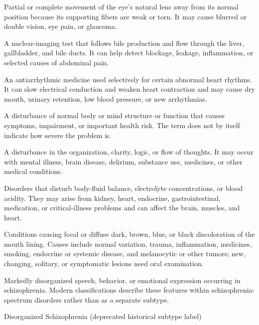  Partial or complete movement of the eye’s natural lens away from its normal position because its supporting fibers are weak or torn. It may cause blurred or double vision, eye pain, or glaucoma.

 A nuclear-imaging test that follows bile production and flow through the liver, gallbladder, and bile ducts. It can help detect blockage, leakage, inflammation, or selected causes of abdominal pain.

 An antiarrhythmic medicine used selectively for certain abnormal heart rhythms. It can slow electrical conduction and weaken heart contraction and may cause dry mouth, urinary retention, low blood pressure, or new arrhythmias.

 A disturbance of normal body or mind structure or function that causes symptoms, impairment, or important health risk. The term does not by itself indicate how severe the problem is.

 A disturbance in the organization, clarity, logic, or flow of thoughts. It may occur with mental illness, brain disease, delirium, substance use, medicines, or other medical conditions.

 Disorders that disturb body-fluid balance, electrolyte concentrations, or blood acidity. They may arise from kidney, heart, endocrine, gastrointestinal, medication, or critical-illness problems and can affect the brain, muscles, and heart.

 Conditions causing focal or diffuse dark, brown, blue, or black discoloration of the mouth lining. Causes include normal variation, trauma, inflammation, medicines, smoking, endocrine or systemic disease, and melanocytic or other tumors; new, changing, solitary, or symptomatic lesions need oral examination.

 Markedly disorganized speech, behavior, or emotional expression occurring in schizophrenia. Modern classifications describe these features within schizophrenia-spectrum disorders rather than as a separate subtype.

\synonyms
Disorganized Schizophrenia (deprecated historical subtype label)

